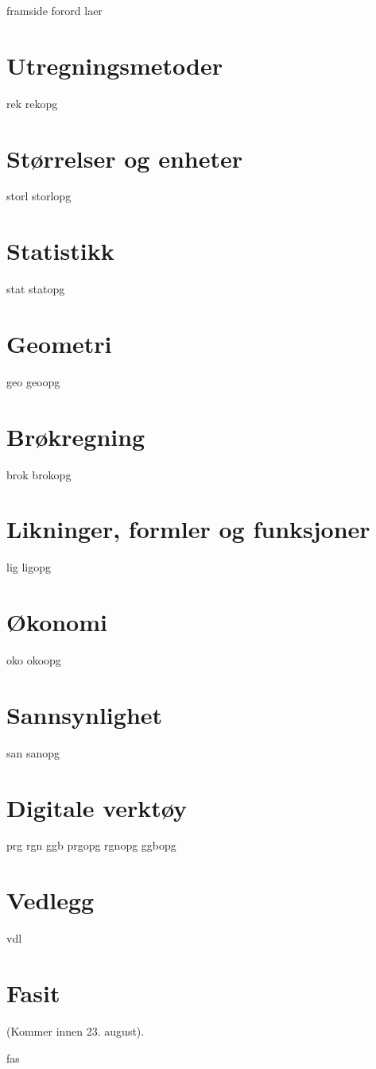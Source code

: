 




{framside}
{forord}
{laer}

\tableofcontents
\chapter{Utregningsmetoder}
\newpage
{rek}
{rekopg}

\chapter{Størrelser og enheter}
\newpage
{storl}
\opgt
{storlopg}

\chapter{Statistikk}
\newpage
{stat}
{statopg}

\chapter{Geometri}
\newpage
{geo}
{geoopg}

\chapter{Brøkregning \label{Br}}
\newpage
{brok}
\newpage
{brokopg}

\chapter{Likninger, formler og funksjoner \label{Lig}}
\newpage
{lig}
{ligopg}

\chapter{Økonomi \label{Oko}}
\newpage
{oko}
{okoopg}

\chapter{Sannsynlighet \label{San}} 
\newpage
{san}
{sanopg}

\chapter{Digitale verktøy}
\newpage
{prg}
{rgn}	
{ggb}	
\opgt
{prgopg}
{rgnopg}	
{ggbopg}	

\chapter*{Vedlegg} 
\newpage
{}
{vdl}


\chapter*{Fasit}
(Kommer innen 23. august).

{fas}






